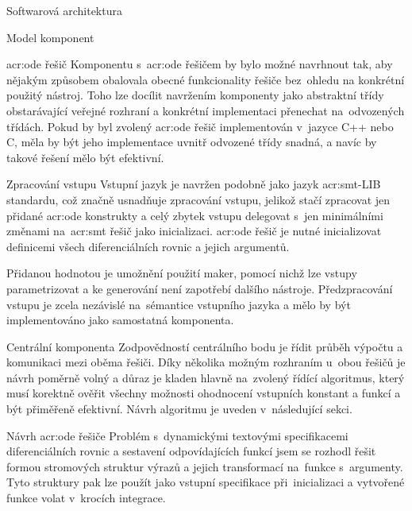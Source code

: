 \documentclass[thesis=M,czech]{FITthesis}[2012/06/26]
\newcommand{\acrlabel}[1]{acr:#1}
\newcommand{\acr}[1]{\acrshort{\acrlabel{#1}}}
\begin{document}
\begin{section}{Softwarová architektura}
\begin{subsection}{Model komponent}
\begin{subsubsection}{\acr{ode} řešič}
Komponentu s~\acr{ode} řešičem
by bylo možné navrhnout tak,
aby nějakým způsobem obalovala
obecné funkcionality řešiče
bez~ohledu na konkrétní použitý nástroj.
Toho lze docílit navržením komponenty
jako abstraktní třídy
obstarávající veřejné rozhraní
a konkrétní implementaci přenechat
na~odvozených třídách.
Pokud by byl zvolený \acr{ode} řešič
implementován v~jazyce C++ nebo C,
měla by být jeho implementace
uvnitř odvozené třídy snadná,
a navíc by takové řešení mělo být efektivní.
\end{subsubsection} %


\begin{subsubsection}{Zpracování vstupu}\label{sss:design:arch:comp:parse}
Vstupní jazyk je navržen podobně
jako jazyk \acr{smt}-LIB standardu,
což značně usnadňuje zpracování vstupu,
jelikož stačí zpracovat jen přidané \acr{ode} konstrukty
a celý zbytek vstupu delegovat s~jen minimálními změnami
na~\acr{smt} řešič jako inicializaci.
\acr{ode} řešič je nutné inicializovat
definicemi všech diferenciálních rovnic
a jejich argumentů.

Přidanou hodnotou je umožnění použití maker,
pomocí nichž lze vstupy parametrizovat
a ke generování není zapotřebí dalšího nástroje.
Předzpracování vstupu je zcela nezávislé
na~sémantice vstupního jazyka
a mělo by být implementováno jako samostatná komponenta.
\end{subsubsection} %


\begin{subsubsection}{Centrální komponenta}
\label{sss:design:arch:comp:center}
Zodpovědností centrálního bodu je řídit
průběh výpočtu a komunikaci mezi oběma řešiči.
Díky několika možným rozhraním u~obou řešičů
je návrh poměrně volný
a důraz je kladen hlavně na~zvolený řídící algoritmus,
který musí korektně ověřit všechny možnosti
ohodnocení vstupních konstant a funkcí
a být přiměřeně efektivní.
Návrh algoritmu je uveden v~následující sekci.
\end{subsubsection} %


\end{subsection} %


\begin{subsection}{Návrh \acr{ode} řešiče}\label{ss:design:arch:ode}
Problém s~dynamickými textovými specifikacemi diferenciálních rovnic
a sestavení odpovídajících funkcí
jsem se rozhodl řešit formou stromových struktur výrazů
a jejich transformací na~funkce s~argumenty.
Tyto struktury pak lze použít jako vstupní specifikace při~inicializaci
a vytvořené funkce volat v~krocích integrace.


\end{subsection}
\end{section}
\end{document}
